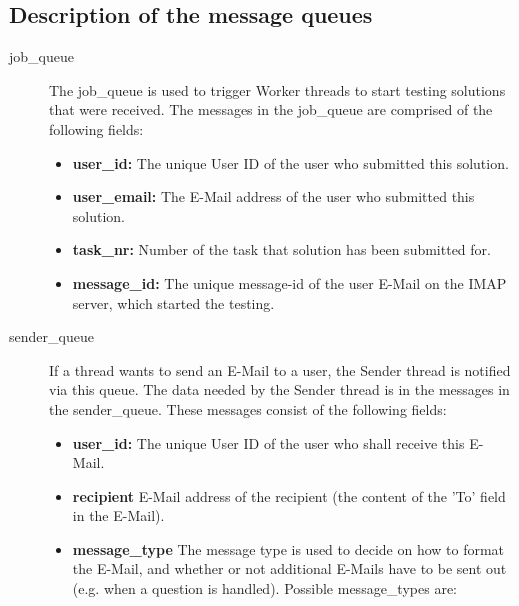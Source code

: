\subsection{Description of the message queues} \label{app:queues}

\begin{description}
\item [job\_queue] The job\_queue is used to trigger Worker threads to start testing
	solutions that were received. The messages in the job\_queue are comprised of
	the following fields:
    \begin{itemize}
        \item {\bf user\_id:} The unique User ID of the user who submitted this solution.
        \item {\bf user\_email:} The E-Mail address of the user who submitted this solution.
        \item {\bf task\_nr:} Number of the task that solution has been submitted for.
        \item {\bf message\_id:} The unique message-id of the user E-Mail on the IMAP server,
			which started the testing.
    \end{itemize}

\item [sender\_queue] If a thread wants to send an E-Mail to a user, the Sender thread
	is notified via this queue. The data needed by the Sender thread is in the messages
	in the sender\_queue. These messages consist of the following fields:
    \begin{itemize}
        \item {\bf user\_id:} The unique User ID of the user who shall receive this E-Mail.
        \item {\bf recipient} E-Mail address of the recipient (the content of the
			'To' field in the E-Mail).
        \item {\bf message\_type} The message type is used to decide on how to format
			the E-Mail, and whether or not additional E-Mails have to be sent out
			(e.g. when a question is handled). Possible message\_types are:


\end{itemize}
\end{description}
